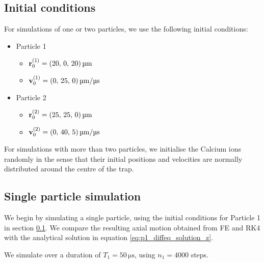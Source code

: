 \subsection{Initial conditions}\label{sec:initial_conditions}
For simulations of one or two particles, we use the following initial conditions:
\begin{itemize}
    \item Particle 1\label{item:initial_conditions_p1}
    \begin{itemize}
        \item[] $\vec{r}^{(1)}_0 = (20, \,0, \,20) \, \mathrm{\text{\textmu}m} $
        \item[] $\vec{v}^{(1)}_0 = (0,\,25,\,0) \, \mathrm{\text{\textmu}m}/ \mathrm{\text{\textmu}s}$
    \end{itemize}
    \item Particle 2\label{item:initial_conditions_p2}
    \begin{itemize}
        \item[] $\vec{r}^{(2)}_0 = (25, \,25, \,0) \, \mathrm{\text{\textmu}m} $
        \item[] $\vec{v}^{(2)}_0 = (0,\,40,\,5) \, \mathrm{\text{\textmu}m}/ \mathrm{\text{\textmu}s}$
    \end{itemize}
\end{itemize}




 For simulations with more than two particles, we initialise the Calcium ions randomly in the sense that their initial positions and velocities are normally distributed around the centre of the trap.


\subsection{Single particle simulation}\label{sec:simulation}
We begin by simulating a single particle, using the initial conditions for Particle 1 in section \ref{sec:initial_conditions}. We compare the resulting axial motion obtained from FE and RK4 with the analytical solution in equation \eqref{eq:p1_diffeq_solution_z}. 

We simulate over a duration of $T_1=50\,\mathrm{\mu s}$, using $n_1=4000$ steps. 

